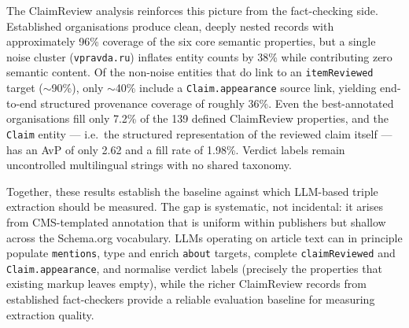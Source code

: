 \documentclass[11pt,a4paper]{article}
\begin{document}
The ClaimReview analysis reinforces this picture from the fact-checking side.
Established organisations produce clean, deeply nested records with
approximately 96\% coverage of the six core semantic properties, but a single
noise cluster (\texttt{vpravda.ru}) inflates entity counts by 38\% while
contributing zero semantic content.  Of the non-noise entities that do link to
an \texttt{itemReviewed} target ($\sim$90\%), only $\sim$40\% include a
\texttt{Claim.appearance} source link, yielding end-to-end structured
provenance coverage of roughly 36\%.  Even the best-annotated organisations
fill only 7.2\% of the 139 defined ClaimReview properties, and the
\texttt{Claim} entity --- i.e.\ the structured representation of the reviewed
claim itself --- has an AvP of only 2.62 and a fill rate of 1.98\%.  Verdict
labels remain uncontrolled multilingual strings with no shared taxonomy.

Together, these results establish the baseline against which LLM-based triple
extraction should be measured.  The gap is systematic, not incidental: it
arises from CMS-templated annotation that is uniform within publishers but
shallow across the Schema.org vocabulary.  LLMs operating on article text can
in principle populate \texttt{mentions}, type and enrich \texttt{about}
targets, complete \texttt{claimReviewed} and \texttt{Claim.appearance}, and
normalise verdict labels (precisely the properties that existing markup
leaves empty), while the richer ClaimReview records from established
fact-checkers provide a reliable evaluation baseline for measuring extraction
quality.



\end{document}
